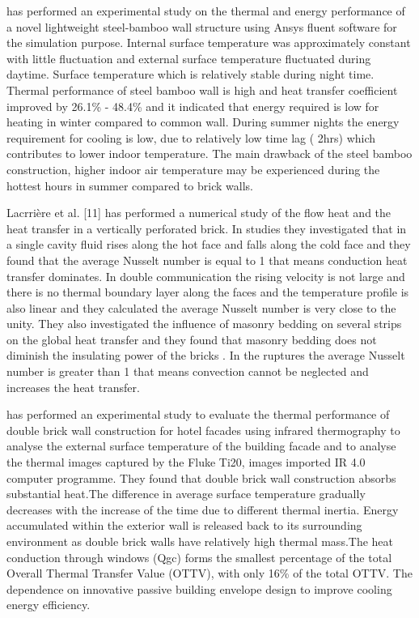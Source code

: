 \documentclass{article}
\begin{document}
\begin{multicols}{2}
\textcite{li2017thermal} has performed an experimental study on the thermal and energy performance of a novel lightweight steel-bamboo wall structure using Ansys fluent software for the simulation purpose. Internal surface temperature was approximately constant with little fluctuation and external surface temperature fluctuated during daytime. Surface temperature which is relatively stable during night time. Thermal performance of steel bamboo wall is high and heat transfer coefficient improved by 26.1\% - 48.4\% and it indicated that energy required is low for heating in winter compared to common wall. During summer nights the energy requirement for cooling is low, due to relatively low time lag ( 2hrs) which contributes to lower indoor temperature. The main drawback of the steel bamboo construction, higher indoor air temperature may be experienced during the hottest hours in summer compared to brick walls.
 
Lacrri\`ere et al. [11] has performed a numerical study of the flow heat and the heat transfer in a vertically perforated brick. In studies they investigated that in a single cavity fluid rises along the hot face and falls along the cold face and they found that the average Nusselt number is equal to 1 that means conduction heat transfer dominates. In double communication the rising velocity is not large and there is no thermal boundary layer along the faces and the temperature profile is also linear and they calculated the average Nusselt number is very close to the unity. They also investigated the influence of masonry bedding on several strips on the global heat transfer and they found that masonry bedding does not diminish the insulating power of the bricks . In the ruptures the average Nusselt number is greater than 1 that means convection cannot be neglected and increases the heat transfer.
 
\textcite{nasir2020thermal} has performed an experimental study to evaluate the thermal performance of double brick wall construction for hotel facades using infrared thermography to analyse the external surface temperature of the building facade and to analyse the thermal images captured by the Fluke Ti20, images imported IR 4.0 computer programme. They found that double brick wall construction absorbs substantial heat.The difference in average surface temperature gradually decreases with the increase of the time due to different thermal inertia. Energy accumulated within the exterior wall is released back to its surrounding environment as double brick walls have relatively high thermal mass.The heat conduction through windows (Qgc) forms the smallest percentage of the total Overall Thermal Transfer Value (OTTV), with only 16\% of the total OTTV. The dependence on innovative passive building envelope design to improve cooling energy efficiency.
 

\end{multicols}
\end{document}
